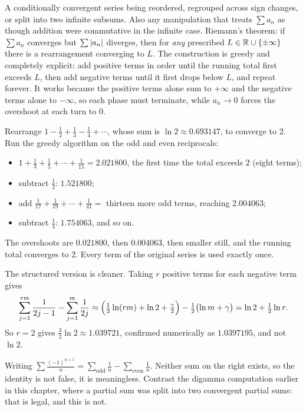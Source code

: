 \cue A conditionally convergent series being reordered, regrouped across sign changes, or split into two infinite subsums. Also any manipulation that treats $\sum a_n$ as though addition were commutative in the infinite case.
\method Riemann's theorem: if $\sum a_n$ converges but $\sum\left\lvert a_n\right\rvert$ diverges, then for \emph{any} prescribed $L\in\mathbb{R}\cup\{\pm\infty\}$ there is a rearrangement converging to $L$. The construction is greedy and completely explicit: add positive terms in order until the running total first exceeds $L$, then add negative terms until it first drops below $L$, and repeat forever. It works because the positive terms alone sum to $+\infty$ and the negative terms alone to $-\infty$, so each phase must terminate, while $a_n\to0$ forces the overshoot at each turn to $0$.

\begin{worked}
Rearrange $1-\tfrac12+\tfrac13-\tfrac14+\cdots$, whose sum is $\ln2\approx0.693147$, to converge to $2$. Run the greedy algorithm on the odd and even reciprocals:
\begin{itemize}
\item $1+\tfrac13+\tfrac15+\cdots+\tfrac{1}{15}=2.021800$, the first time the total exceeds $2$ (eight terms);
\item subtract $\tfrac12$: $1.521800$;
\item add $\tfrac{1}{17}+\tfrac{1}{19}+\cdots+\tfrac{1}{41}=$ thirteen more odd terms, reaching $2.004063$;
\item subtract $\tfrac14$: $1.754063$, and so on.
\end{itemize}
The overshoots are $0.021800$, then $0.004063$, then smaller still, and the running total converges to $2$. Every term of the original series is used exactly once.

The structured version is cleaner. Taking $r$ positive terms for each negative term gives
\[\sum_{j=1}^{rm}\frac{1}{2j-1}-\sum_{j=1}^{m}\frac{1}{2j}\approx\Bigl(\tfrac12\ln(rm)+\ln2+\tfrac{\gamma}{2}\Bigr)-\tfrac12\bigl(\ln m+\gamma\bigr)=\ln2+\tfrac12\ln r.\]
So $r=2$ gives $\tfrac32\ln2\approx1.039721$, confirmed numerically as $1.0397195$, and not $\ln2$.
\end{worked}

\begin{trap}
Writing $\sum\frac{(-1)^{n+1}}{n}=\sum_{\mathrm{odd}}\frac1n-\sum_{\mathrm{even}}\frac1n$. Neither sum on the right exists, so the identity is not false, it is meaningless. Contrast the digamma computation earlier in this chapter, where a partial sum was split into two convergent partial sums: that is legal, and this is not.
\end{trap}

